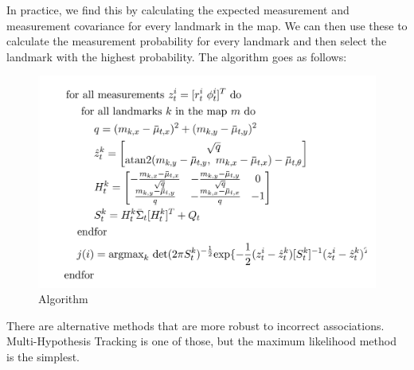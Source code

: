 \documentclass[twoside]{article}
\begin{document}
In practice, we find this by calculating the expected measurement and measurement covariance for every landmark in the map. We can then use these to calculate the measurement probability for every landmark and then select the landmark with the highest probability. The algorithm goes as follows:

\begin{figure}[H]
\centering
\includegraphics[]{algorithm_fig1}
\caption{Algorithm}
\end{figure}

There are alternative methods that are more robust to incorrect associations. Multi-Hypothesis Tracking is one of those, but the maximum likelihood method is the simplest.
\end{document}
